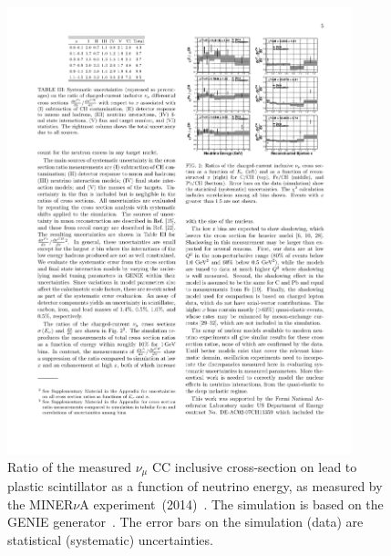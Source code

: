 \begin{figure}%
  \centering
  \includegraphics[width=10cm]{images/neutrino_interactions/MINERvA_XSec.pdf}
  \caption{Ratio of the measured $\nu_\mu$ CC inclusive cross-section on lead to plastic scintillator as a function of neutrino energy, as measured by the MINER$\nu$A experiment~(2014)~\cite{PhysRevLett.112.231801}.  The simulation is based on the GENIE generator~\cite{Andreopoulos201087}.  The error bars on the simulation (data) are statistical (systematic) uncertainties.}
  \label{fig:MINERvAXSec}
\end{figure}
\newline
\newline
